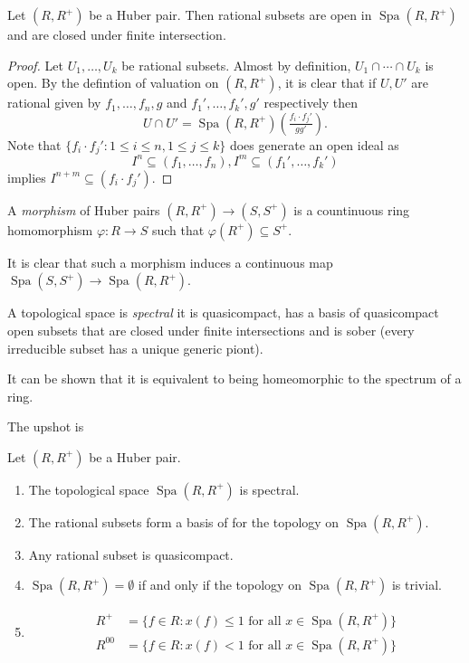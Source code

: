 \documentclass[a4paper]{article}
\DeclareMathOperator{\Spa}{Spa}
\begin{document}
\begin{lemma}
  Let \((R, R^+)\) be a Huber pair. Then rational subsets are open in \(\Spa(R, R^+)\) and are closed under finite intersection.
\end{lemma}

\begin{proof}
  Let \(U_1, \dots, U_k\) be rational subsets. Almost by definition, \(U_1 \cap \cdots \cap U_k\) is open. By the defintion of valuation on \((R, R^+)\), it is clear that if \(U, U'\) are rational given by \(f_1, \dots, f_n, g\) and \(f_1', \dots, f_k', g'\) respectively then
  \[
    U \cap U' = \Spa(R, R^+)(\tfrac{f_i \cdot f_j'}{gg'}).
  \]
  Note that \(\{f_i \cdot f_j': 1 \leq i \leq n, 1 \leq j \leq k\}\) does generate an open ideal as
  \[
    I^n \subseteq (f_1, \dots, f_n), I^m \subseteq (f_1', \dots, f_k')
  \]
  implies \(I^{n + m} \subseteq (f_i \cdot f_j')\).
\end{proof}

\begin{definition}
  A \emph{morphism} of Huber pairs \((R, R^+) \to (S, S^+)\) is a countinuous ring homomorphism \(\varphi: R \to S\) such that \(\varphi(R^+) \subseteq S^+\).
\end{definition}

It is clear that such a morphism induces a continuous map \(\Spa(S, S^+) \to \Spa(R, R^+)\).

\begin{definition}
  A topological space is \emph{spectral} it is quasicompact, has a basis of quasicompact open subsets that are closed under finite intersections and is sober (every irreducible subset has a unique generic piont).
\end{definition}

It can be shown that it is equivalent to being homeomorphic to the spectrum of a ring.

The upshot is

\begin{theorem}
  \label{thm:properties of Spa}
  Let \((R, R^+)\) be a Huber pair.
  \begin{enumerate}
  \item The topological space \(\Spa(R, R^+)\) is spectral.
  \item The rational subsets form a basis of for the topology on \(\Spa(R, R^+)\).
  \item Any rational subset is quasicompact.
  \item \(\Spa(R, R^+) = \emptyset\) if and only if the topology on \(\Spa(R, R^+)\) is trivial.
  \item
    \begin{align*}
      R^+ &= \{f \in R: x(f) \leq 1 \text{ for all } x \in \Spa(R, R^+)\} \\
      R^{00} &= \{f \in R: x(f) < 1 \text{ for all } x \in \Spa(R, R^+)\}
    \end{align*}
  \end{enumerate}
\end{theorem}
\end{document}
